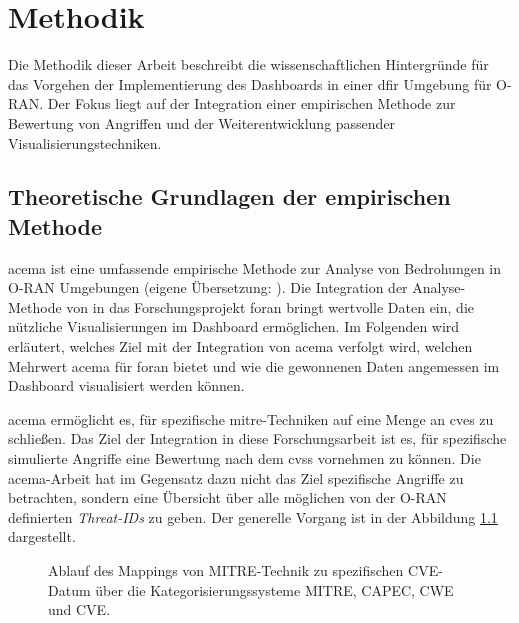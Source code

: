 \chapter{Methodik}
\label{chap:methodik}
Die Methodik dieser Arbeit beschreibt die wissenschaftlichen Hintergründe für das Vorgehen der Implementierung des Dashboards in einer \gls{dfir} Umgebung für O-RAN. Der Fokus liegt auf der Integration einer empirischen Methode zur Bewertung von Angriffen und der Weiterentwicklung passender Visualisierungstechniken. 
\section{Theoretische Grundlagen der empirischen Methode}
\label{sec:auswahlDerEmpirischenMethode}
\gls{acema} ist \glqq{}eine umfassende empirische Methode zur Analyse von Bedrohungen in O-RAN Umgebungen\grqq{} (eigene Übersetzung: \autocite{klementSecuring6GTransition2024}). Die Integration der Analyse-Methode von \citeauthor{klementSecuring6GTransition2024} in das Forschungsprojekt \gls{foran} bringt wertvolle Daten ein, die nützliche Visualisierungen im Dashboard ermöglichen. Im Folgenden wird erläutert, welches Ziel mit der Integration von \gls{acema} verfolgt wird, welchen Mehrwert \gls{acema} für \gls{foran} bietet und wie die gewonnenen Daten angemessen im Dashboard visualisiert werden können.
\par \gls{acema} ermöglicht es, für spezifische \gls{mitre}-Techniken auf eine Menge an \glspl{cve} zu schließen. Das Ziel der Integration in diese Forschungsarbeit ist es, für spezifische simulierte Angriffe eine Bewertung nach dem \gls{cvss} vornehmen zu können. Die \gls{acema}-Arbeit hat im Gegensatz dazu nicht das Ziel spezifische Angriffe zu betrachten, sondern eine Übersicht über alle möglichen von der O-RAN definierten \textit{Threat-IDs} zu geben. Der generelle Vorgang ist in der Abbildung \ref{fig:mitre_mapping} dargestellt.

%
\begin{figure}
    \centering
    \caption{Ablauf des Mappings von MITRE-Technik zu spezifischen CVE-Datum über die Kategorisierungssysteme MITRE, CAPEC, CWE und CVE.}
    \label{fig:mitre_mapping}
\end{figure}

